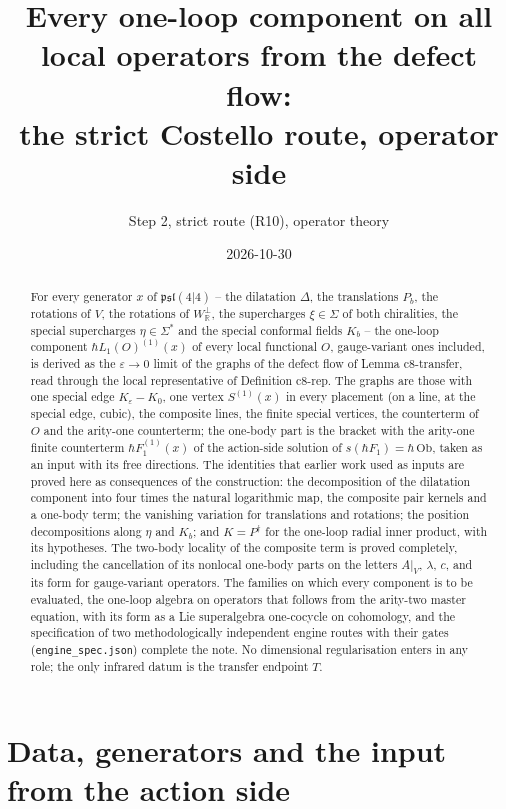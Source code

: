 \documentclass[11pt]{article}
\title{Every one-loop component on all local operators from the defect flow:\\ the strict Costello route, operator side}
\author{Step 2, strict route (R10), operator theory}
\date{2026-10-30}
\numberwithin{equation}{section}
\theoremstyle{plain}
\theoremstyle{definition}
\newcommand{\psl}{\mathfrak{psl}(4|4)}
\begin{document}
\maketitle

\begin{abstract}
For every generator $x$ of $\psl$ -- the dilatation $\Delta$, the translations $P_b$, the rotations of $V$, the rotations of $W_{\mathbb R}^\perp$, the supercharges $\xi\in\Sigma$ of both chiralities, the special supercharges $\eta\in\Sigma^*$ and the special conformal fields $K_b$ -- the one-loop component $\hbar L_1(O)^{(1)}(x)$ of every local functional $O$, gauge-variant ones included, is derived as the $\varepsilon\to0$ limit of the graphs of the defect flow of Lemma c8-transfer, read through the local representative of Definition c8-rep. The graphs are those with one special edge $K_\varepsilon-K_0$, one vertex $S^{(1)}(x)$ in every placement (on a line, at the special edge, cubic), the composite lines, the finite special vertices, the counterterm of $O$ and the arity-one counterterm; the one-body part is the bracket with the arity-one finite counterterm $\hbar F_1^{(1)}(x)$ of the action-side solution of $s(\hbar F_1)=\hbar\,\mathrm{Ob}$, taken as an input with its free directions. The identities that earlier work used as inputs are proved here as consequences of the construction: the decomposition of the dilatation component into four times the natural logarithmic map, the composite pair kernels and a one-body term; the vanishing variation for translations and rotations; the position decompositions along $\eta$ and $K_b$; and $K=P^\dagger$ for the one-loop radial inner product, with its hypotheses. The two-body locality of the composite term is proved completely, including the cancellation of its nonlocal one-body parts on the letters $A|_V$, $\lambda$, $c$, and its form for gauge-variant operators. The families on which every component is to be evaluated, the one-loop algebra on operators that follows from the arity-two master equation, with its form as a Lie superalgebra one-cocycle on cohomology, and the specification of two methodologically independent engine routes with their gates (\texttt{engine\_spec.json}) complete the note. No dimensional regularisation enters in any role; the only infrared datum is the transfer endpoint $T$.
\end{abstract}

\tableofcontents

\section{Data, generators and the input from the action side}
\label{sec:op-data}
\end{document}
